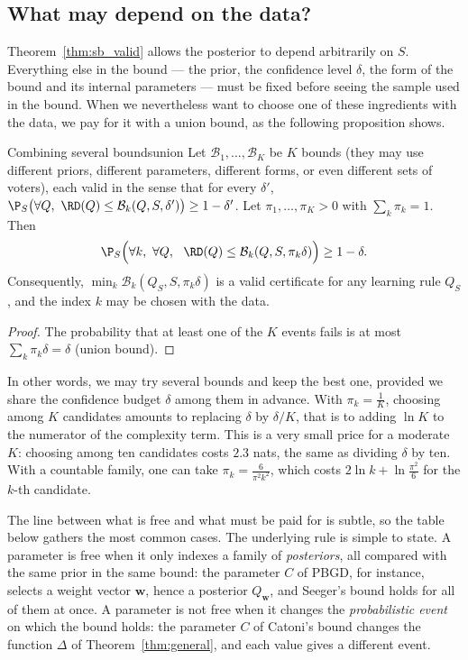 \subsection{What may depend on the data?}\label{sec:sb_rules}

Theorem~\ref{thm:sb_valid} allows the posterior to depend arbitrarily on $S$.
Everything else in the bound --- the prior, the confidence level $\delta$, the form
of the bound and its internal parameters --- must be fixed before seeing the
sample used in the bound. When we nevertheless want to choose one of these
ingredients with the data, we pay for it with a union bound, as the following
proposition shows.

\begin{proposition}{Combining several bounds}{union}
Let $\mathcal B_1,\dots,\mathcal B_K$ be $K$ bounds (they may use different priors,
different parameters, different forms, or even different sets of voters),
each valid in the sense that for every $\delta'$,
$\P_S\big(\forall Q,\ \RD(Q)\leq\mathcal B_k(Q,S,\delta')\big)\geq1-\delta'$.
Let $\pi_1,\dots,\pi_K>0$ with $\sum_k\pi_k=1$. Then
\[
\P_S\Big(\forall k,\ \forall Q,\ \ \RD(Q)\leq\mathcal B_k(Q,S,\pi_k\delta)\Big)\geq1-\delta.
\]
Consequently, $\min_k\mathcal B_k(Q_S,S,\pi_k\delta)$ is a valid certificate for any
learning rule $Q_S$, and the index $k$ may be chosen with the data.
\end{proposition}
\begin{proof}
The probability that at least one of the $K$ events fails is at most
$\sum_k\pi_k\delta=\delta$ (union bound).
\end{proof}

In other words, we may try several bounds and keep the best one, provided we
share the confidence budget $\delta$ among them in advance. With
$\pi_k=\frac1K$, choosing among $K$ candidates amounts to replacing $\delta$ by
$\delta/K$, that is to adding $\ln K$ to the numerator of the complexity term.
This is a very small price for a moderate $K$: choosing among ten candidates
costs $2.3$ nats, the same as dividing $\delta$ by ten. With a countable family,
one can take $\pi_k=\frac{6}{\pi^2k^2}$, which costs $2\ln k+\ln\frac{\pi^2}6$ for the
$k$-th candidate.

The line between what is free and what must be paid for is subtle, so the
table below gathers the most common cases. The underlying rule is simple to
state. A parameter is free when it only indexes a family of
\emph{posteriors}, all compared with the same prior in the same bound: the
parameter $C$ of PBGD, for instance, selects a weight vector $\mathbf w$, hence a
posterior $Q_{\mathbf w}$, and Seeger's bound holds for all of them at once. A
parameter is not free when it changes the \emph{probabilistic event} on which
the bound holds: the parameter $C$ of Catoni's bound changes the function
$\Delta$ of Theorem~\ref{thm:general}, and each value gives a different event.

